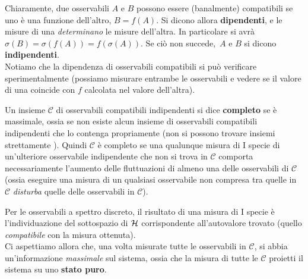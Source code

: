 \documentclass[../../FisicaTeorica.tex]{subfiles}
\begin{document}
Chiaramente, due osservabili $A$ e $B$ possono essere (banalmente) compatibili se uno è una funzione dell'altro, $B=f(A)$. Si dicono allora \textbf{dipendenti}, e le misure di una \textit{determinano} le misure dell'altra.
In particolare si avrà $\sigma(B)=\sigma(f(A))=f(\sigma(A))$. Se ciò non succede,\ $A$ e $B$ si dicono \textbf{indipendenti}.\\
Notiamo che la dipendenza di osservabili compatibili si può verificare sperimentalmente (possiamo misurare entrambe le osservabili e vedere se il valore di una coincide con $f$ calcolata nel valore dell'altra).\\
\begin{dfn}
Un insieme $\mathcal{C}$ di osservabili compatibili indipendenti si dice \textbf{completo} se è massimale, ossia se non esiste alcun insieme di osservabili compatibili indipendenti che lo contenga propriamente (non si possono trovare insiemi strettamente ). Quindi $\mathcal{C}$ è completo se una qualunque misura di I specie di un'ulteriore osservabile indipendente che non si trova in $\mathcal{C}$ comporta necessariamente l'aumento delle fluttuazioni di almeno una delle osservabili di $\mathcal{C}$ (ossia eseguire una misura di un qualsiasi osservabile non compresa tra quelle in $\mathcal{C}$ \textit{disturba} quelle delle osservabili in $\mathcal{C}$).
\end{dfn}
Per le osservabili a spettro discreto, il risultato di una misura di I specie è l'individuazione del sottospazio di $\mathcal{H}$ corrispondente all'autovalore trovato (quello \textit{compatibile} con la misura ottenuta).\\
Ci aspettiamo allora che, una volta misurate tutte le osservabili in $\mathcal{C}$, si abbia un'informazione \textit{massimale} sul sistema, ossia che la misura di tutte le $\mathcal{C}$ proietti il sistema su uno \textbf{stato puro}.
\end{document}
